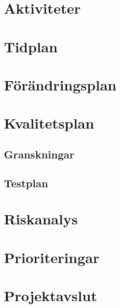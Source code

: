\documentclass{article}
\begin{document}
\section{Aktiviteter}
\section{Tidplan}
\section{Förändringsplan}
\section{Kvalitetsplan}

\subsection{Granskningar}
\subsection{Testplan}

\section{Riskanalys}
\section{Prioriteringar}
\section{Projektavslut}
\end{document}
